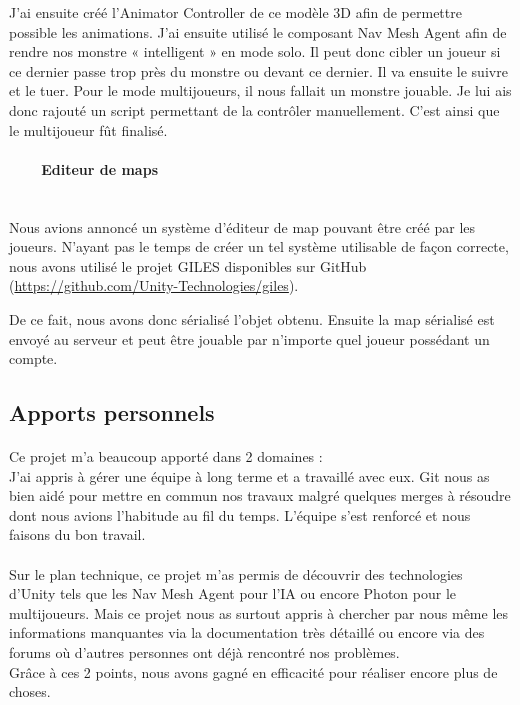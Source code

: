 \documentclass[titlepage, 13px, a4paper]{report}
\begin{document}
J’ai ensuite créé l’Animator Controller de ce modèle 3D afin de permettre possible les animations.
J’ai ensuite utilisé le composant Nav Mesh Agent afin de rendre nos monstre « intelligent » en mode solo.
Il peut donc cibler un joueur si ce dernier passe trop près du monstre ou devant ce dernier. Il va ensuite le suivre et le tuer.
Pour le mode multijoueurs, il nous fallait un monstre jouable.
Je lui ais donc rajouté un script permettant de la contrôler manuellement.
C’est ainsi que le multijoueur fût finalisé. \\


\paragraph{~~~~Editeur de maps} \hspace{0pt} \\
Nous avions annoncé un système d’éditeur de map pouvant être créé par les joueurs.
N’ayant pas le temps de créer un tel système utilisable de façon correcte, nous avons utilisé le projet GILES 
disponibles sur GitHub (\url{https://github.com/Unity-Technologies/giles}).

De ce fait, nous avons donc sérialisé l’objet obtenu. Ensuite la map sérialisé est envoyé au serveur et peut être 
jouable par n’importe quel joueur possédant un compte. \\


\subsection{Apports personnels}
\paragraph{} \hspace{0pt}
Ce projet m’a beaucoup apporté dans 2 domaines : \\
J’ai appris à gérer une équipe à long terme et a travaillé avec eux. Git nous as bien aidé pour 
mettre en commun nos travaux malgré quelques merges à résoudre dont nous avions l’habitude au fil du temps.
L’équipe s’est renforcé et nous faisons du bon travail. \\ 

\paragraph{} \hspace{0pt}
Sur le plan technique, ce projet m’as permis de découvrir des technologies d’Unity tels que les Nav Mesh Agent 
pour l’IA ou encore Photon pour le multijoueurs.
Mais ce projet nous as surtout appris à chercher par nous même les informations manquantes via la documentation 
très détaillé ou encore via des forums où d’autres personnes ont déjà rencontré nos problèmes. \\
Grâce à ces 2 points, nous avons gagné en efficacité pour réaliser encore plus de choses. 
\end{document}
